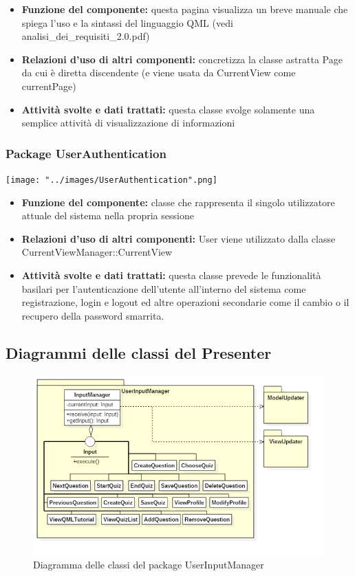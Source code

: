 \documentclass[a4paper,11pt]{article}
\begin{document}
			\begin{itemize}
		    \item\textbf{Funzione del componente:} questa pagina visualizza un breve manuale che spiega l'uso e la sintassi del linguaggio QML (vedi analisi\_dei\_requisiti\_2.0.pdf)
			\item\textbf{Relazioni d'uso di altri componenti:} concretizza la classe astratta Page da cui è diretta discendente (e viene usata da CurrentView come currentPage)
			\item\textbf{Attività svolte e dati trattati:} questa classe svolge solamente una semplice attività di visualizzazione di informazioni
			\end{itemize}
			\subsubsection{Package UserAuthentication}
			\begin{center}
				\texttt{[image: "../images/UserAuthentication".png]}
			\end{center}	
			\begin{itemize}
\item\textbf{Funzione del componente:} classe che rappresenta il singolo utilizzatore attuale del sistema nella propria sessione
\item\textbf{Relazioni d'uso di altri componenti:} User viene utilizzato dalla classe CurrentViewManager::CurrentView
\item\textbf{Attività svolte e dati trattati:} questa classe prevede le funzionalità basilari per l'autenticazione dell'utente all'interno del sistema come registrazione, login e  logout ed altre operazioni secondarie come il cambio o il recupero della password smarrita.
			\end{itemize}
			\newpage
			
			\subsection{Diagrammi delle classi del Presenter}
			\begin{figure}[h!]
			\begin{center}
				\includegraphics[scale=0.65]{../images/UserInputManagerClass.png}
				\caption{Diagramma delle classi del package UserInputManager}
			\end{center}
			\end{figure}
\end{document}
